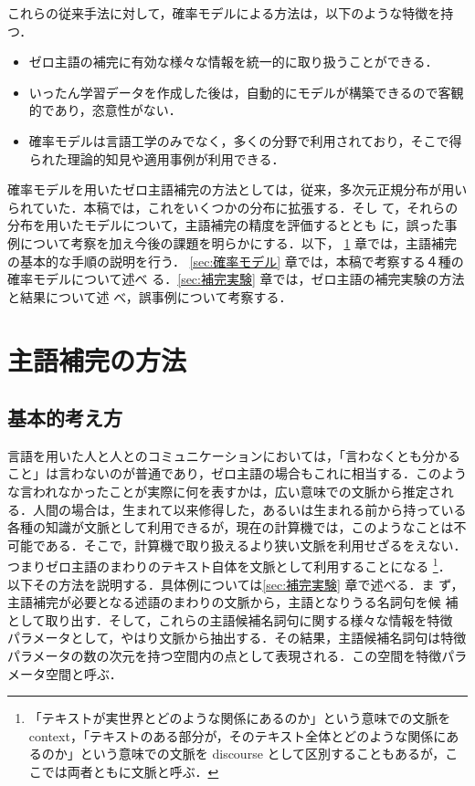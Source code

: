 これらの従来手法に対して，確率モデルによる方法は，以下のような特徴を持つ．
\begin{itemize}
\item ゼロ主語の補完に有効な様々な情報を統一的に取り扱うことができる．
\item いったん学習データを作成した後は，自動的にモデルが構築できるので客観的であり，恣意性がない．
\item 確率モデルは言語工学のみでなく，多くの分野で利用されており，そこで得られた理論的知見や適用事例が利用できる．
\end{itemize}

確率モデルを用いたゼロ主語補完の方法としては，従来，多次元正規分布が用い
られていた\cite{金94}．本稿では，これをいくつかの分布に拡張する．そし
て，それらの分布を用いたモデルについて，主語補完の精度を評価するととも
に，誤った事例について考察を加え今後の課題を明らかにする．以下，
\ref{sec:主語補完の方法} 章では，主語補完の基本的な手順の説明を行う．
\ref{sec:確率モデル} 章では，本稿で考察する４種の確率モデルについて述べ
る．\ref{sec:補完実験} 章では，ゼロ主語の補完実験の方法と結果について述
べ，誤事例について考察する．

\section{主語補完の方法} \label{sec:主語補完の方法}

\subsection{基本的考え方} \label{subsec:基本的考え方}
言語を用いた人と人とのコミュニケーションにおいては，「言わなくとも分かること」は言わないのが普通であり，ゼロ主語の場合もこれに相当する．このような言われなかったことが実際に何を表すかは，広い意味での文脈から推定される．人間の場合は，生まれて以来修得した，あるいは生まれる前から持っている各種の知識が文脈として利用できるが，現在の計算機では，このようなことは不可能である．そこで，計算機で取り扱えるより狭い文脈を利用せざるをえない．つまりゼロ主語のまわりのテキスト自体を文脈として利用することになる
\footnote{「テキストが実世界とどのような関係にあるのか」という意味での文脈を context，「テキストのある部分が，そのテキスト全体とどのような関係にあるのか」という意味での文脈を discourse として区別することもあるが，ここでは両者ともに文脈と呼ぶ．}．
以下その方法を説明する．具体例については\ref{sec:補完実験} 章で述べる．ま
ず，主語補完が必要となる述語のまわりの文脈から，主語となりうる名詞句を候
補として取り出す．そして，これらの主語候補名詞句に関する様々な情報を特徴
パラメータとして，やはり文脈から抽出する．その結果，主語候補名詞句は特徴
パラメータの数の次元を持つ空間内の点として表現される．この空間を特徴パラ
メータ空間と呼ぶ．


